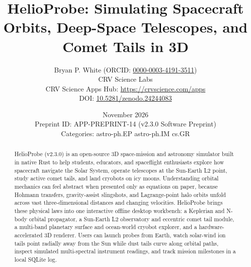 \documentclass[10pt,letterpaper]{article}
\title{\textbf{HelioProbe: Simulating Spacecraft Orbits, Deep-Space Telescopes, and Comet Tails in 3D}}
\author{Bryan P. White (ORCID: \href{https://orcid.org/0000-0003-4191-3511}{0000-0003-4191-3511}) \\ CRV Science Labs \\ \small CRV Science Apps Hub: \url{https://crvscience.com/apps} \\ \small DOI: \href{https://doi.org/10.5281/zenodo.24244083}{10.5281/zenodo.24244083}}
\date{November 2026 \\ \small Preprint ID: APP-PREPRINT-14 (v2.3.0 Software Preprint) \\ \small Categories: astro-ph.EP \textbullet{} astro-ph.IM \textbullet{} cs.GR}
\begin{document}
\maketitle

\begin{abstract}
HelioProbe (v2.3.0) is an open-source 3D space-mission and astronomy simulator built in native Rust to help students, educators, and spaceflight enthusiasts explore how spacecraft navigate the Solar System, operate telescopes at the Sun-Earth L2 point, study active comet tails, and land cryobots on icy moons. Understanding orbital mechanics can feel abstract when presented only as equations on paper, because Hohmann transfers, gravity-assist slingshots, and Lagrange-point halo orbits unfold across vast three-dimensional distances and changing velocities. HelioProbe brings these physical laws into one interactive offline desktop workbench: a Keplerian and N-body orbital propagator, a Sun-Earth L2 observatory and eccentric comet tail module, a multi-band planetary surface and ocean-world cryobot explorer, and a hardware-accelerated 3D renderer. Users can launch probes from Earth, watch solar-wind ion tails point radially away from the Sun while dust tails curve along orbital paths, inspect simulated multi-spectral instrument readings, and track mission milestones in a local SQLite log.
\end{abstract}
\end{document}
